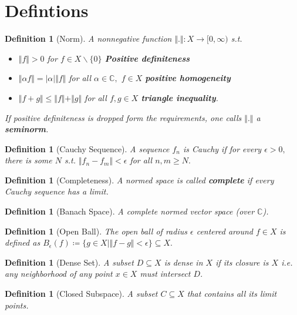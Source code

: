 \documentclass[10pt]{article}
\newtheorem{definition}[]{Definition}
\begin{document}
\section{Defintions}

\begin{definition}[Norm]
    A nonnegative function $\Vert.\Vert:X\to[0,\infty)$ s.t.
    \begin{itemize}
        \item $\Vert f\Vert>0$ for $f\in X\backslash\{0\}$ \textbf{Positive definiteness}
        \item $\Vert\alpha f\Vert = |\alpha|\Vert f\Vert$ for all $\alpha\in\mathbb{C},$ $f\in X$ \textbf{positive homogeneity}
        \item $\Vert f+g\Vert \le \Vert f\Vert +\Vert g\Vert$ for all $f,g\in X$ \textbf{triangle inequality}.
    \end{itemize}
    If positive definiteness is dropped form the requirements, one calls $\Vert.\Vert$ a \textbf{seminorm}.
\end{definition}

\begin{definition}[Cauchy Sequence]
    A sequence $f_n$ is Cauchy if for every $\epsilon>0,$ there is some $N$ s.t. $\Vert f_n-f_m\Vert < \epsilon$ for all $n,m\ge N.$
\end{definition}

\begin{definition}[Completeness]
    A normed space is called \textbf{complete} if every Cauchy sequence has a limit.
\end{definition}

\begin{definition}[Banach Space]
    A complete normed vector space (over $\mathbb{C}$).
\end{definition}

\begin{definition}[Open Ball]
    The open ball of radius $\epsilon$ centered around $f\in X$ is defined as $B_\epsilon(f)\coloneqq\{g\in X|\Vert f-g\Vert<\epsilon\}\subseteq X.$
\end{definition}

\begin{definition}[Dense Set]
    A subset $D \subseteq X$ is dense in $X$ if its closure is $X$ i.e. any neighborhood of any point $x\in X$ must intersect $D.$
\end{definition}

\begin{definition}[Closed Subspace]
    A subset $C \subseteq X$ that contains all its limit points.
\end{definition}
\end{document}
